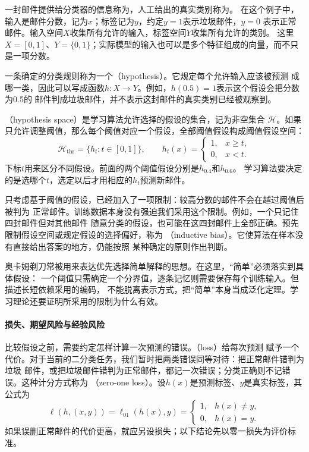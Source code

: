 一封邮件提供给分类器的信息称为，人工给出的真实类别称为。
在这个例子中，输入是邮件分数，记为$x$；标签记为$y$，约定$y=1$表示垃圾邮件，$y=0$
表示正常邮件。输入空间$X$收集所有允许的输入，标签空间$Y$收集所有允许的类别。
这里$X=[0,1]$、$Y=\{0,1\}$；实际模型的输入也可以是多个特征组成的向量，而不只是一项分数。

一条确定的分类规则称为一个（hypothesis）。它规定每个允许输入应该被预测
成哪一类，因此可以写成函数$h:X\to Y$。例如，$h(0.5)=1$表示这个假设会把分数为0.5的
邮件判成垃圾邮件，并不表示这封邮件的真实类别已经被观察到。

（hypothesis space）是学习算法允许选择的假设的集合，记为非空集合
$\mathcal H$。如果只允许调整阈值，那么每个阈值对应一个假设，全部阈值假设构成阈值假设空间：
\begin{equation}
 \mathcal H_{\mathrm{thr}}=\{h_t:t\in[0,1]\},\qquad
 h_t(x)=\begin{cases}
  1,&x\geq t,\\
  0,&x<t.
 \end{cases}
 \label{eq:threshold-hypothesis-class}
\end{equation}
下标$t$用来区分不同假设。前面的两个阈值假设分别是$h_{0.4}$和$h_{0.6}$。
学习算法要决定的是选哪个$t$，选定以后才用相应的$h_t$预测新邮件。

只考虑基于阈值的假设，已经加入了一项限制：较高分数的邮件不会在越过阈值后被判为
正常邮件。训练数据本身没有强迫我们采用这个限制。例如，一个只记住四封邮件但对其他邮件
随意分类的假设，也可能在这四封邮件上全部正确。预先限制假设空间或规定假设的选择偏好，称为
（inductive bias）。它使算法在样本没有直接给出答案的地方，仍能按照
某种确定的原则作出判断。

奥卡姆剃刀常被用来表达优先选择简单解释的思想。在这里，“简单”必须落实到具体假设：
一个阈值只需确定一个分界值，逐条记忆则需要保存每个训练输入。但描述长短依赖采用的编码，
不能脱离表示方式，把“简单”本身当成泛化定理。学习理论还要证明所采用的限制为什么有效。

\paragraph{损失、期望风险与经验风险}

比较假设之前，需要约定怎样计算一次预测的错误。（loss）给每次预测
赋予一个代价。对于当前的二分类任务，我们暂时把两类错误同等对待：把正常邮件错判为垃圾
邮件，或把垃圾邮件错判为正常邮件，都记一次错误；分类正确则不记错误。这种计分方式称为
（zero-one loss）。设$h(x)$是预测标签、$y$是真实标签，其公式为
\begin{equation}
 \ell(h,(x,y))=\ell_{01}(h(x),y)=\begin{cases}
  1,&h(x)\neq y,\\
  0,&h(x)=y.
 \end{cases}
 \label{eq:zero-one-loss}
\end{equation}
如果误删正常邮件的代价更高，就应另设损失；以下结论先以零一损失为评价标准。

